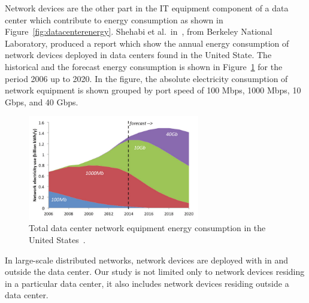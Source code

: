 Network devices are the other part in the IT equipment component of a data center which contribute to energy consumption as shown in Figure~\ref{fig:datacenterenergy}. Shehabi et al.~in~\cite{shehabi2016united}, from Berkeley National Laboratory, produced a report which show the annual energy consumption of network devices deployed in data centers found in the United State. The historical and the forecast energy consumption is shown in Figure~\ref{fig:usnetworkenergy} for the period 2006 up to 2020. In the figure, the absolute electricity consumption of network equipment is shown grouped by port speed of 100 Mbps, 1000 Mbps, 10 Gbps, and 40 Gbps. 
\begin{figure}[ht]
	\begin{center}
		\includegraphics[width=7.5cm]{images/usnetworkenergy.pdf}
		\caption{Total data center network equipment energy consumption in the United States~\cite{shehabi2016united}.}
		\label{fig:usnetworkenergy}
	\end{center}
\end{figure}

In large-scale distributed networks, network devices are deployed with in and outside the data center. Our study is not limited only to network devices residing in a particular data center, it also includes network devices residing outside a data center. 

